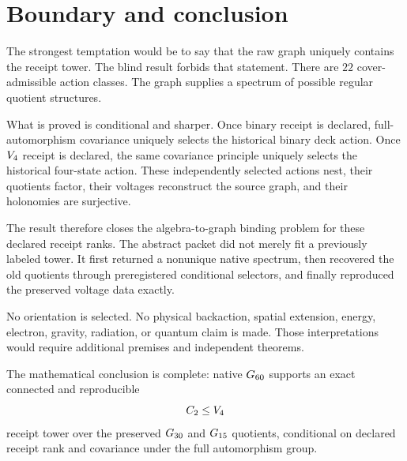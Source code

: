 \section{Boundary and conclusion}

The strongest temptation would be to say that the raw graph uniquely
contains the receipt tower.  The blind result forbids that statement.
There are \(22\) cover-admissible action classes.  The graph supplies a
spectrum of possible regular quotient structures.

What is proved is conditional and sharper.  Once binary receipt is
declared, full-automorphism covariance uniquely selects the historical
binary deck action.  Once \(V_{4}\) receipt is declared, the same
covariance principle uniquely selects the historical four-state
action.  These independently selected actions nest, their quotients
factor, their voltages reconstruct the source graph, and their
holonomies are surjective.

The result therefore closes the algebra-to-graph binding problem for
these declared receipt ranks.  The abstract packet did not merely fit
a previously labeled tower.  It first returned a nonunique native
spectrum, then recovered the old quotients through preregistered
conditional selectors, and finally reproduced the preserved voltage
data exactly.

No orientation is selected.  No physical backaction, spatial
extension, energy, electron, gravity, radiation, or quantum claim is
made.  Those interpretations would require additional premises and
independent theorems.

The mathematical conclusion is complete: native \(G_{60}\) supports
an exact connected and reproducible
\[
  C_{2}\leq V_{4}
\]
receipt tower over the preserved \(G_{30}\) and \(G_{15}\)
quotients, conditional on declared receipt rank and covariance under
the full automorphism group.
